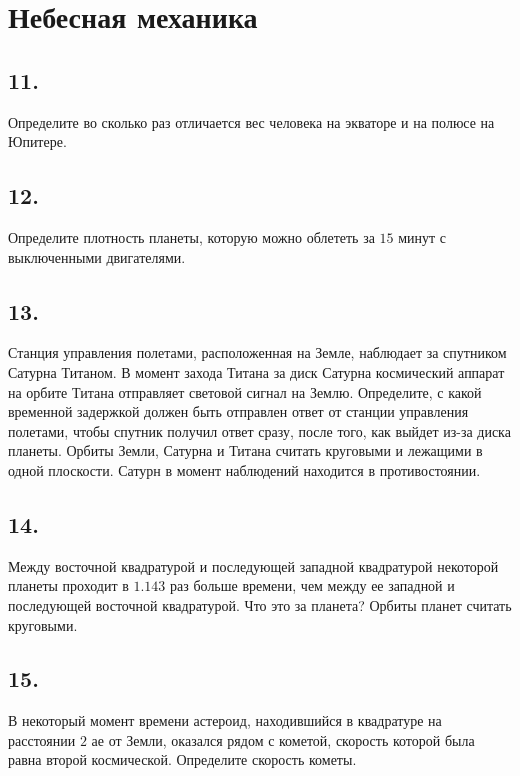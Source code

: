 \documentclass[a4paper,12pt]{article}
\begin{document}
\section*{Небесная механика}

\subsection*{11. } 

Определите во сколько раз отличается вес человека на экваторе и на полюсе на Юпитере.

\subsection*{12. }

Определите плотность планеты, которую можно облететь за $15$ минут с выключенными двигателями.


\subsection*{13. }

Станция управления полетами, расположенная на Земле, наблюдает за спутником Сатурна Титаном. В момент захода Титана за диск Сатурна космический аппарат на орбите Титана отправляет световой сигнал на Землю. Определите, с какой временной задержкой должен быть отправлен ответ от станции управления полетами, чтобы спутник получил ответ сразу, после того, как выйдет из-за диска планеты. Орбиты Земли, Сатурна и Титана считать круговыми и лежащими в одной плоскости. Сатурн в момент наблюдений находится в противостоянии.

\subsection*{14.}

Между восточной квадратурой и последующей западной квадратурой некоторой планеты проходит в $1.143$ раз больше времени, чем между ее западной и последующей восточной квадратурой. Что это за планета? Орбиты планет считать круговыми. 

\subsection*{15.}

В некоторый момент времени астероид, находившийся в квадратуре на расстоянии $2$ ае от Земли, оказался рядом с кометой, скорость которой была равна второй космической. Определите скорость кометы. 
\end{document}
